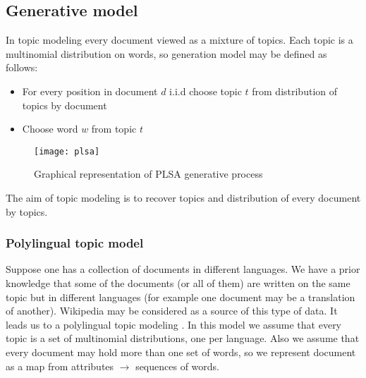 \subsection*{Generative model} \label{generativeModel}
    In topic modeling every document viewed as a mixture of topics. Each topic is a multinomial distribution on words,
    so generation model may be defined as follows:
    \begin{itemize} \label{generation}
	\item For every position in document $d$ i.i.d choose topic $t$ from distribution of topics by document
	\item Choose word $w$ from topic $t$
    \end{itemize}
    \begin{figure}[!ht]
	\caption{Graphical representation of PLSA generative process}
	\begin{minipage}{\textwidth}
	    \texttt{[image: plsa]}
	\end{minipage}
    \end{figure}
    The aim of topic modeling is to recover topics and distribution of every document by topics.
    \subsubsection*{Polylingual topic model}
	Suppose one has a collection of documents in different languages. We have a prior knowledge that some of the
	documents (or all of them) are written on the same topic but in different languages (for example one document may be a translation of another).
	Wikipedia may be considered as a source of this type of data. It leads us to a polylingual topic modeling \cite{polylingual}.
	In this model we assume that every topic is a set of multinomial distributions, one per language. Also we assume that
	every document may hold more than one set of words, so we represent document as a map from attributes $\to$  sequences of words.

